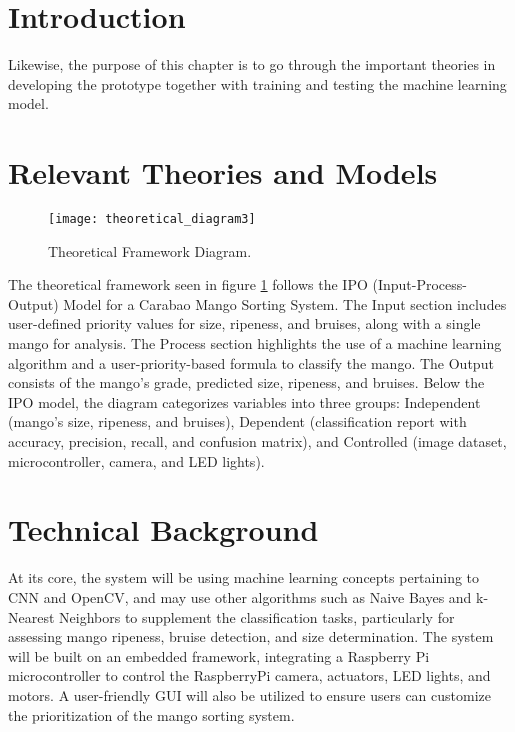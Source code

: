 \section{Introduction}

Likewise, the purpose of this chapter is to go through the important theories in developing the prototype together with training and testing the machine learning model.

\section{Relevant Theories and Models}

\begin{figure}[!htbp]
	\centering
	\texttt{[image: theoretical\_diagram3]}
	\caption{Theoretical Framework Diagram.}
	\label{fig:theoreticalDiagram1}
\end{figure}

The theoretical framework seen in figure \ref{fig:theoreticalDiagram1} 
follows the IPO (Input-Process-Output) Model for a Carabao Mango Sorting
System. The Input section includes user-defined priority values for size,
ripeness, and bruises, along with a single mango for analysis. The Process
section highlights the use of a machine learning algorithm and a
user-priority-based formula to classify the mango. The Output consists of the
mango’s grade, predicted size, ripeness, and bruises. Below the IPO model, the
diagram categorizes variables into three groups: Independent (mango’s size,
ripeness, and bruises), Dependent (classification report with accuracy,
precision, recall, and confusion matrix), and Controlled (image dataset,
microcontroller, camera, and LED lights).

\section{Technical Background}

At its core, the system will be using machine learning concepts pertaining to
\gls{CNN} and OpenCV, and may use other algorithms such as Naive Bayes and
k-Nearest Neighbors to supplement the classification tasks, particularly for
assessing mango ripeness, bruise detection, and size determination. The system
will be built on an embedded framework, integrating a Raspberry Pi
microcontroller to control the RaspberryPi camera, actuators, LED lights, and
motors. A user-friendly GUI will also be utilized to ensure users can customize
the prioritization of the mango sorting system.

